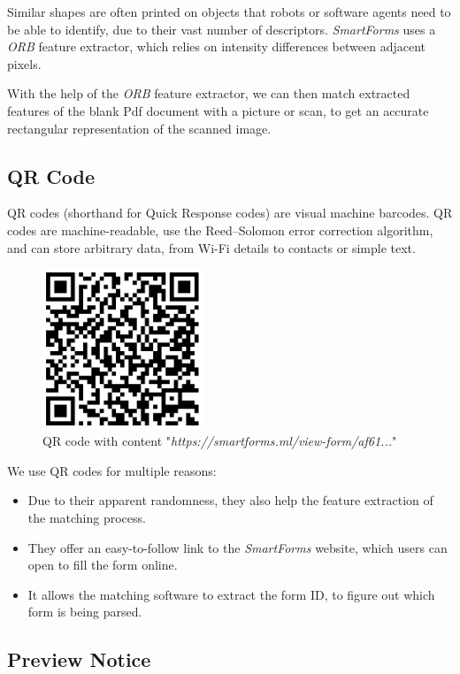 \documentclass[11pt, a4paper]{report}
\begin{document}
Similar shapes are often printed on objects that robots or software agents need to be able to identify, due to their vast number of descriptors. \textit{SmartForms} uses a \textit{ORB} feature extractor\cite{rublee2011orb}, which relies on intensity differences between adjacent pixels.

With the help of the \textit{ORB} feature extractor, we can then match extracted features of the blank Pdf document with a picture or scan, to get an accurate rectangular representation of the scanned image.

\subsection{QR Code}

QR codes (shorthand for Quick Response codes) are visual machine barcodes. QR codes are machine-readable, use the Reed–Solomon error correction algorithm\cite{wicker1999reed}, and can store arbitrary data, from Wi-Fi details to contacts or simple text.

\begin{figure}[!h]
    \centering
    \includegraphics[width=13em]{images/screenshoots/sample-qr-code.png}
    \caption{QR code with content "\textit{https://smartforms.ml/view-form/af61...}"}
    \label{fig:label}
\end{figure}

We use QR codes for multiple reasons:
\begin{itemize}
    \item Due to their apparent randomness, they also help the feature extraction of the matching process.
    \item They offer an easy-to-follow link to the \textit{SmartForms} website, which users can open to fill the form online.
    \item It allows the matching software to extract the form ID, to figure out which form is being parsed.
\end{itemize}

\subsection{Preview Notice}
\end{document}
